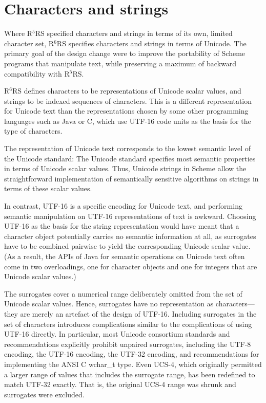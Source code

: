 \documentclass[twoside,twocolumn]{algol60}
\newcommand{\rn}[1]{R$^{#1}$RS}
\begin{document}
\section{Characters and strings}

Where \rn{5} specified characters and strings in terms of its own,
limited character set, \rn{6} specifies characters and strings in
terms of Unicode.  The primary goal of the design change were to
improve the portability of Scheme programs that manipulate text, while
preserving a maximum of backward compatibility with \rn{5}.

\rn{6} defines characters to be representations of Unicode scalar
values, and strings to be indexed sequences of characters.  This is a
different representation for Unicode text than the representations
chosen by some other programming languages such as Java or
C\sharpsign{}, which use UTF-16 code units as the basis for the type
of characters.

The representation of Unicode text corresponds to the lowest semantic
level of the Unicode standard: The Unicode standard specifies most
semantic properties in terms of Unicode scalar values.  Thus, Unicode
strings in Scheme allow the straightforward implementation of
semantically sensitive algorithms on strings in terms of these scalar
values.

In contrast, UTF-16 is a specific encoding for Unicode text, and
performing semantic manipulation on UTF-16 representations of text is
awkward.  Choosing UTF-16 as the basis for the string representation
would have meant that a character object potentially carries no
semantic information at all, as surrogates have to be combined
pairwise to yield the corresponding Unicode scalar value.  (As a
result, the APIs of Java for semantic operations on Unicode text often
come in two overloadings, one for character objects and one for
integers that are Unicode scalar values.)

The surrogates cover a numerical range deliberately omitted from the
set of Unicode scalar values.  Hence, surrogates have no
representation as characters---they are merely an artefact of the
design of UTF-16.  Including surrogates in the set of characters
introduces complications similar to the complications of using UTF-16
directly.  In particular, most Unicode consortium standards and
recommendations explicitly prohibit unpaired surrogates, including the
UTF-8 encoding, the UTF-16 encoding, the UTF-32 encoding, and
recommendations for implementing the ANSI C {\cf wchar\_t} type.  Even
UCS-4, which originally permitted a larger range of values that
includes the surrogate range, has been redefined to match UTF-32
exactly. That is, the original UCS-4 range was shrunk and surrogates
were excluded.
\end{document}
